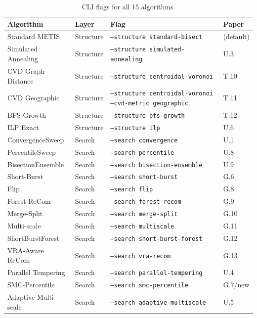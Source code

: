\begin{table}[ht]
\centering
\caption{CLI flags for all 15 algorithms.}
\label{tab:cli}
\small
\begin{tabular}{@{}llll@{}}
\toprule
Algorithm & Layer & Flag & Paper \\
\midrule
Standard METIS       & Structure & \texttt{--structure standard-bisect}    & (default) \\
Simulated Annealing  & Structure & \texttt{--structure simulated-annealing}  & U.3 \\
CVD Graph-Distance   & Structure & \texttt{--structure centroidal-voronoi}   & T.10 \\
CVD Geographic       & Structure & \texttt{--structure centroidal-voronoi --cvd-metric geographic} & T.11 \\
BFS Growth           & Structure & \texttt{--structure bfs-growth}          & T.12 \\
ILP Exact            & Structure & \texttt{--structure ilp}                 & U.6 \\
\midrule
ConvergenceSweep     & Search & \texttt{--search convergence}           & U.1 \\
PercentileSweep      & Search & \texttt{--search percentile}            & U.8 \\
BisectionEnsemble    & Search & \texttt{--search bisection-ensemble}    & U.9 \\
Short-Burst          & Search & \texttt{--search short-burst}           & G.6 \\
Flip                 & Search & \texttt{--search flip}                  & G.8 \\
Forest ReCom         & Search & \texttt{--search forest-recom}          & G.9 \\
Merge-Split          & Search & \texttt{--search merge-split}           & G.10 \\
Multi-scale          & Search & \texttt{--search multiscale}            & G.11 \\
ShortBurstForest     & Search & \texttt{--search short-burst-forest}    & G.12 \\
VRA-Aware ReCom      & Search & \texttt{--search vra-recom}             & G.13 \\
Parallel Tempering   & Search & \texttt{--search parallel-tempering}    & U.4 \\
SMC-Percentile       & Search & \texttt{--search smc-percentile}        & G.7/new \\
Adaptive Multi-scale & Search & \texttt{--search adaptive-multiscale}   & U.5 \\
\bottomrule
\end{tabular}
\end{table}

